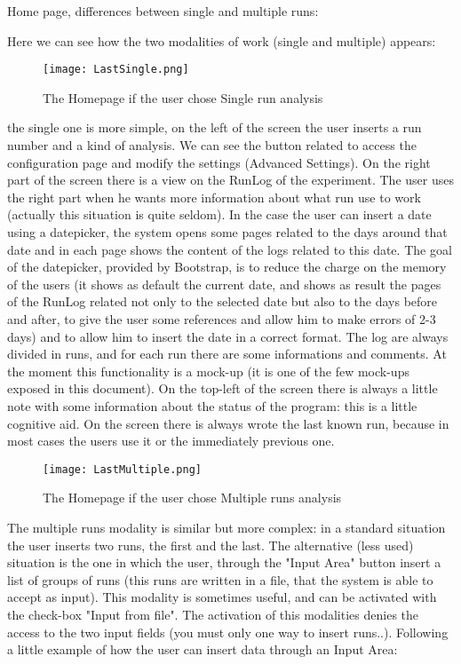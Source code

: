 Home page, differences between single and multiple runs:

Here we can see how the two modalities of work (single and multiple) appears: 
\begin{figure}[H]
\centering
\texttt{[image: LastSingle.png]} 
\caption{The Homepage if the user chose Single run analysis}
\end{figure}

the single one is more simple, on the left of the screen the user inserts a run number and a kind of analysis. We can see the button related to access the configuration page and modify the settings (Advanced Settings). On the right part of the screen there is a view on the RunLog of the experiment. The user uses the right part when he wants more information about what run use to work (actually this situation is quite seldom). In the case the user can insert a date using a datepicker, the system opens some pages related to the days around that date and in each page shows the content of the logs related to this date. The goal of the datepicker, provided by Bootstrap, is to reduce the charge on the memory of the users (it shows as default the current date, and shows as result the pages of the RunLog related not only to the selected date but also to the days before and after, to give the user some references and allow him to make errors of 2-3 days) and to allow him to insert the date in a correct format. The log are always divided in runs, and for each run there are some informations and comments. At the moment this functionality is a mock-up (it is one of the few  mock-ups exposed in this document). On the top-left of the screen there is always a little note with some information about the status of the program: this is a little cognitive aid. On the screen there is always wrote the last known run, because in most cases the users use it or the immediately previous one. 


\begin{figure}[H]
\centering
\texttt{[image: LastMultiple.png]} 
\caption{The Homepage if the user chose Multiple runs analysis}
\end{figure}    

The multiple runs modality is similar but more complex: in a standard situation the user inserts two runs, the first and the last. The alternative (less used) situation is the one in which the user, through the "Input Area" button insert a  list of groups of runs (this runs are written in a file, that the system is able to accept as input). This modality is sometimes useful, and can be activated with the check-box "Input from file". The activation of this modalities denies the access to the two input fields (you must only one way to insert runs..).
Following a little example of how the user can insert data through an Input Area:

